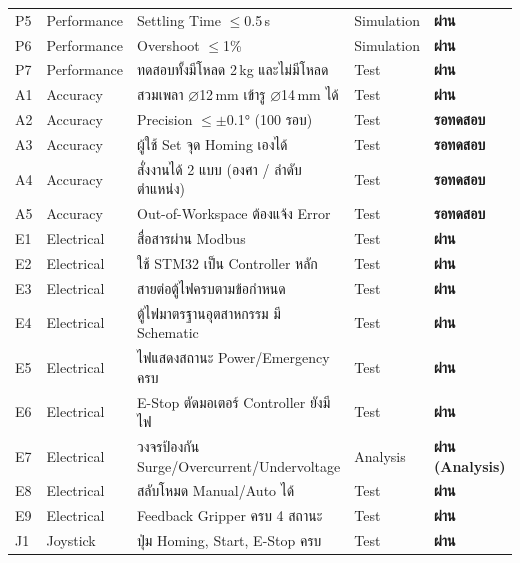 \begin{longtable}{llp{5cm}ll}
    P5  & Performance & Settling Time $\leq$0.5\,s                 & Simulation & \textbf{ผ่าน} \\
    P6  & Performance & Overshoot $\leq$1\%                        & Simulation & \textbf{ผ่าน} \\
    P7  & Performance & ทดสอบทั้งมีโหลด 2\,kg และไม่มีโหลด       & Test       & \textbf{ผ่าน} \\
    \midrule
    A1  & Accuracy & สวมเพลา $\diameter$12\,mm เข้ารู $\diameter$14\,mm ได้ & Test     & \textbf{ผ่าน} \\
    A2  & Accuracy & Precision $\leq \pm$0.1° (100 รอบ)           & Test    & \textbf{รอทดสอบ} \\
    A3  & Accuracy & ผู้ใช้ Set จุด Homing เองได้                 & Test    & \textbf{รอทดสอบ} \\
    A4  & Accuracy & สั่งงานได้ 2 แบบ (องศา / ลำดับตำแหน่ง)     & Test    & \textbf{รอทดสอบ} \\
    A5  & Accuracy & Out-of-Workspace ต้องแจ้ง Error              & Test    & \textbf{รอทดสอบ} \\
    \midrule
    E1  & Electrical & สื่อสารผ่าน Modbus                         & Test    & \textbf{ผ่าน} \\
    E2  & Electrical & ใช้ STM32 เป็น Controller หลัก             & Test    & \textbf{ผ่าน} \\
    E3  & Electrical & สายต่อตู้ไฟครบตามข้อกำหนด                 & Test    & \textbf{ผ่าน} \\
    E4  & Electrical & ตู้ไฟมาตรฐานอุตสาหกรรม มี Schematic        & Test    & \textbf{ผ่าน} \\
    E5  & Electrical & ไฟแสดงสถานะ Power/Emergency ครบ            & Test    & \textbf{ผ่าน} \\
    E6  & Electrical & E-Stop ตัดมอเตอร์ Controller ยังมีไฟ      & Test    & \textbf{ผ่าน} \\
    E7  & Electrical & วงจรป้องกัน Surge/Overcurrent/Undervoltage & Analysis & \textbf{ผ่าน (Analysis)} \\
    E8  & Electrical & สลับโหมด Manual/Auto ได้                   & Test    & \textbf{ผ่าน} \\
    E9  & Electrical & Feedback Gripper ครบ 4 สถานะ               & Test    & \textbf{ผ่าน} \\
    \midrule
    J1  & Joystick & ปุ่ม Homing, Start, E-Stop ครบ               & Test    & \textbf{ผ่าน} \\
\end{longtable}


